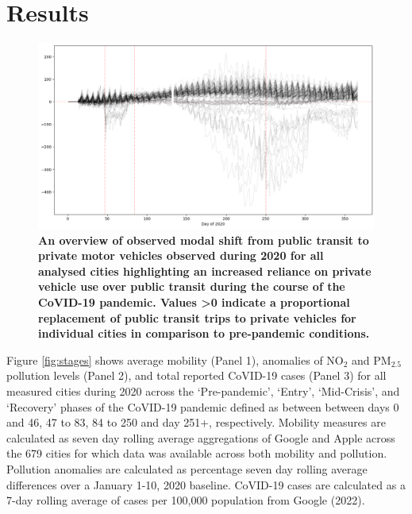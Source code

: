 \documentclass[preprint,12pt]{elsarticle}
\begin{document}
\section*{Results}

\begin{figure}
\centering
\includegraphics[trim={0 0 0 0},clip,scale=0.4]{Images/DrivingvsTransit.png}
\caption{\bf An overview of observed modal shift from public transit to private motor vehicles observed during 2020 for all analysed cities highlighting an increased reliance on private vehicle use over public transit during the course of the CoVID-19 pandemic. Values \textgreater 0 indicate a proportional replacement of public transit trips to private vehicles for individual cities in comparison to pre-pandemic conditions.}  
 \label{fig:driv_trans}
\end{figure}


Figure \ref{fig:stages} shows average mobility (Panel 1), anomalies of NO$_{2}$ and PM$_{2.5}$ pollution levels (Panel 2), and total reported CoVID-19 cases (Panel 3) for all measured cities during 2020 across the `Pre-pandemic', `Entry', `Mid-Crisis', and `Recovery' phases of the CoVID-19 pandemic defined as between between days 0 and 46, 47 to 83, 84 to 250 and day 251+, respectively. Mobility measures are calculated as seven day rolling average aggregations of Google and Apple across the 679 cities for which data was available across both mobility and pollution. Pollution anomalies are calculated as percentage seven day rolling average differences over a January 1-10, 2020 baseline. CoVID-19 cases are calculated as a 7-day rolling average of cases per 100,000 population from Google (2022)\cite{Google2022}.
\end{document}
